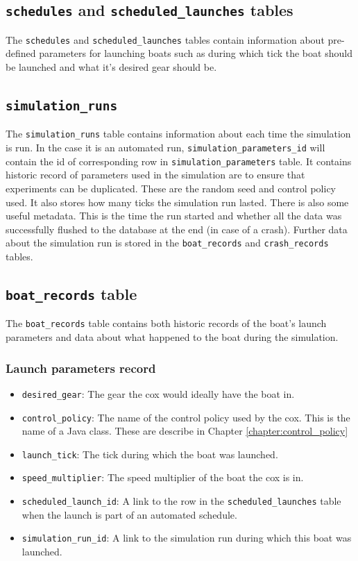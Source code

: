 \subsection{\texttt{schedules} and \texttt{scheduled\_launches}
  tables}
The \texttt{schedules} and \texttt{scheduled\_launches} tables contain
information about pre-defined parameters for launching boats such as
during which tick the boat should be launched and what it's desired
gear should be.


\subsection{\texttt{simulation\_runs}}
The \texttt{simulation\_runs} table contains information about each
time the simulation is run. In the case it is an automated run,
\texttt{simulation\_parameters\_id} will contain the id of corresponding row in
\texttt{simulation\_parameters} table. It contains historic record of parameters
  used in the simulation are to ensure that experiments can be
  duplicated. These are the random seed and control policy used. It
  also stores how many ticks the simulation run lasted. There is also
  some useful metadata. This is the time the run started and whether
  all the data was successfully flushed to the database at the end (in
  case of a crash). Further data about the simulation run is stored
  in the \texttt{boat\_records} and \texttt{crash\_records} tables.

\subsection{\texttt{boat\_records} table}
The \texttt{boat\_records} table contains both historic records of the
boat's launch parameters and data about what happened to the boat
during the simulation.

\subsubsection{Launch parameters record}

\begin{itemize}
  \item{\texttt{desired\_gear}:} The gear the cox would ideally have the boat
    in.
  \item{\texttt{control\_policy}:} The name of the control policy used by the
    cox. This is the name of a Java class. These are describe in Chapter \ref{chapter:control_policy}
  \item{\texttt{launch\_tick}:} The tick during which the boat was launched.
  \item{\texttt{speed\_multiplier}:} The speed multiplier of the boat the cox
    is in.
  \item{\texttt{scheduled\_launch\_id}:} A link to the row in the
    \texttt{scheduled\_launches} table when the launch is part of an
    automated schedule.
  \item{\texttt{simulation\_run\_id}:} A link to the simulation run during
    which this boat was launched.
\end{itemize}

